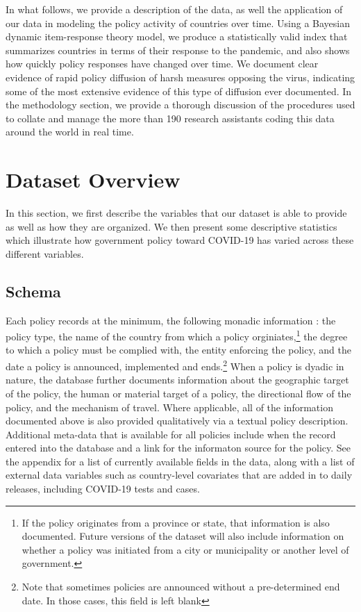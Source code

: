 \documentclass[]{article}
\let\rmarkdownfootnote\footnote%
\def\footnote{\protect\rmarkdownfootnote}
\begin{document}
In what follows, we provide a description of the data, as well the application of our data in modeling the policy activity of countries over time. Using a Bayesian dynamic item-response theory model, we produce a statistically valid index that summarizes countries in terms of their response to the pandemic, and also shows how quickly policy responses have changed over time. We document clear evidence of rapid policy diffusion of harsh measures opposing the virus, indicating some of the most extensive evidence of this type of diffusion ever documented. In the methodology section, we provide a thorough discussion of the procedures used to collate and manage the more than 190 research assistants coding this data around the world in real time.

\hypertarget{dataset-overview}{%
\section{Dataset Overview}\label{dataset-overview}}

In this section, we first describe the variables that our dataset is able to provide as well as how they are organized. We then present some descriptive statistics which illustrate how government policy toward COVID-19 has varied across these different variables.

\hypertarget{schema}{%
\subsection{Schema}\label{schema}}

Each policy records at the minimum, the following monadic information : the policy type, the name of the country from which a policy orginiates,\footnote{If the policy originates from a province or state, that information is also documented. Future versions of the dataset will also include information on whether a policy was initiated from a city or municipality or another level of government.} the degree to which a policy must be complied with, the entity enforcing the policy, and the date a policy is announced, implemented and ends.\footnote{Note that sometimes policies are announced without a pre-determined end date. In those cases, this field is left blank} When a policy is dyadic in nature, the database further documents information about the geographic target of the policy, the human or material target of a policy, the directional flow of the policy, and the mechanism of travel. Where applicable, all of the information documented above is also provided qualitatively via a textual policy description. Additional meta-data that is available for all policies include when the record entered into the database and a link for the informaton source for the policy. See the appendix for a list of currently available fields in the data, along with a list of external data variables such as country-level covariates that are added in to daily releases, including COVID-19 tests and cases.
\end{document}
